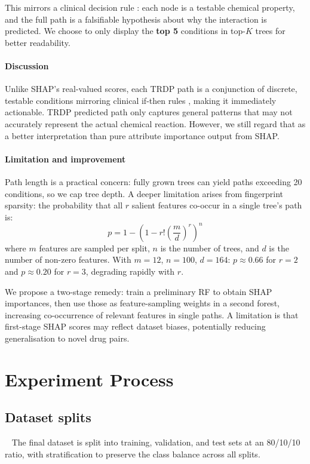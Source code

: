 \documentclass[letterpaper]{article} %
\begin{document}
This mirrors a clinical decision rule \cite{Rudin2019}: each node is a testable chemical property, and the full path is a falsifiable hypothesis about why the interaction is predicted. We choose to only display the \textbf{top 5} conditions in top-$K$ trees for better readability.

\paragraph{Discussion}
Unlike SHAP's real-valued scores, each TRDP path is a conjunction of discrete, testable conditions mirroring clinical if-then rules \cite{Rudin2019}, making it immediately actionable. TRDP predicted path only captures general patterns that may not accurately represent the actual chemical reaction. However, we still regard that as a better interpretation than pure attribute importance output from SHAP.

\paragraph{Limitation and improvement}

Path length is a practical concern: fully grown trees can yield paths exceeding 20 conditions, so we cap tree depth. A deeper limitation arises from fingerprint sparsity: the probability that all $r$ salient features co-occur in a single tree's path is:
\begin{equation}
   p = 1 - \left(1 - r! \left(\frac{m}{d}\right)^{r}\right)^{n}
\end{equation}
where $m$ features are sampled per split, $n$ is the number of trees, and $d$ is the number of non-zero features. With $m=12$, $n=100$, $d=164$: $p\approx0.66$ for $r=2$ and $p\approx0.20$ for $r=3$, degrading rapidly with $r$.

We propose a two-stage remedy: train a preliminary RF to obtain SHAP importances, then use those as feature-sampling weights in a second forest, increasing co-occurrence of relevant features in single paths. A limitation is that first-stage SHAP scores may reflect dataset biases, potentially reducing generalisation to novel drug pairs.

\section{Experiment Process}

\subsection{Dataset splits}
\ 
\newline
The final dataset is split into training, validation, and test sets at an 80/10/10 ratio, with stratification to preserve the class balance across all splits.
\end{document}
